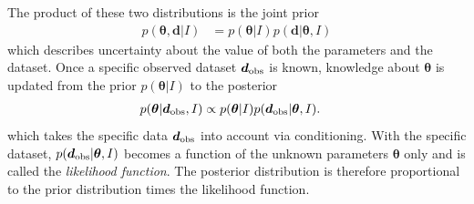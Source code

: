 \documentclass[review]{elsarticle}
\newcommand{\params}{\boldsymbol{\theta}}
\newcommand{\data}{\boldsymbol{d}}
\newcommand{\info}{I}
\newcommand{\changed}{\color{blue}}
\begin{document}
The
product of these two distributions is the joint prior
\begin{align}
p(\params, \data | \info) &= p(\params | \info)p(\data | \params, \info)
\end{align}
which describes uncertainty about the value of both the parameters and the
dataset. Once a specific observed dataset $\data_{\rm obs}$ is known, knowledge about
$\params$ is updated from the prior $p(\params | \info)$ to the posterior
\begin{align}
p(\params | \data_{\rm obs}, \info) &\propto
    p(\params | \info)p(\data_{\rm obs} | \params, \info).
\end{align}
which takes the specific data $\data_{\rm obs}$ into account {\changed via conditioning}.
With the specific dataset,
$p(\data_{\rm obs} | \params,\info)$ becomes a function of the
unknown parameters $\params$ only and is called the {\em likelihood function}.
The posterior distribution is therefore proportional to the prior distribution
times the likelihood function.
\end{document}
